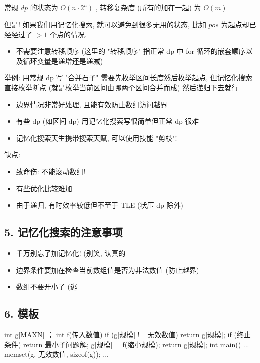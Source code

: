 常规 $dp$ 的状态为 $O(n\cdot 2^n)$ , 转移复杂度 (所有的加在一起) 为 $O(m)$

但是! 如果我们用记忆化搜索, 就可以避免到很多无用的状态, 比如 $pos$ 为起点却已经经过了 $>1$ 个点的情况.

\begin{itemize}
\item 不需要注意转移顺序 (这里的 "转移顺序" 指正常 dp 中 for 循环的嵌套顺序以及循环变量是递增还是递减)
\end{itemize}

举例: 用常规 dp 写 "合并石子" 需要先枚举区间长度然后枚举起点, 但记忆化搜索直接枚举断点 (就是枚举当前区间由哪两个区间合并而成) 然后递归下去就行

\begin{itemize}
\item 边界情况非常好处理, 且能有效防止数组访问越界
\item 有些 dp (如区间 dp) 用记忆化搜索写很简单但正常 dp 很难
\item 记忆化搜索天生携带搜索天赋, 可以使用技能 "剪枝"!
\end{itemize}

缺点:

\begin{itemize}
\item 致命伤: 不能滚动数组!
\item 有些优化比较难加
\item 由于递归, 有时效率较低但不至于 TLE (状压 dp 除外)
\end{itemize}

\hr

\subsection{5. 记忆化搜索的注意事项}

\begin{itemize}
\item 千万别忘了加记忆化! (别笑, 认真的
\item 边界条件要加在检查当前数组值是否为非法数值 (防止越界)
\item 数组不要开小了 (逃
\end{itemize}

\subsection{6. 模板}

\begin{cppcode}
int g[MAXN] ； int f(传入数值) {
  if (g[规模] != 无效数值) return g[规模];
  if (终止条件) return 最小子问题解;
  g[规模] = f(缩小规模);
  return g[规模];
}
int main() {
  ... memset(g, 无效数值, sizeof(g));
  ...
}
\end{cppcode}
